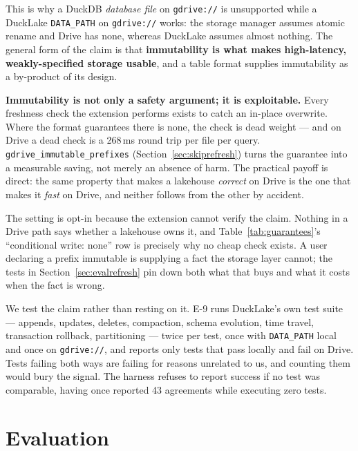 \documentclass[sigconf, nonacm]{acmart}
\newcommand{\expref}[1]{\textsf{E-#1}}
\begin{document}
This is why a DuckDB \emph{database file} on \texttt{gdrive://} is unsupported
while a DuckLake \texttt{DATA\_PATH} on \texttt{gdrive://} works: the storage
manager assumes atomic rename and Drive has none, whereas DuckLake assumes
almost nothing. The general form of the claim is that \textbf{immutability is
what makes high-latency, weakly-specified storage usable}, and a table format
supplies immutability as a by-product of its design.

\textbf{Immutability is not only a safety argument; it is exploitable.}
Every freshness check the extension performs exists to catch an in-place
overwrite. Where the format guarantees there is none, the check is dead
weight --- and on Drive a dead check is a 268\,ms round trip per file per
query. \texttt{gdrive\_immutable\_prefixes} (Section~\ref{sec:skiprefresh})
turns the guarantee into a measurable saving, not merely an absence of harm.
The practical payoff is direct: the same property that makes a lakehouse
\emph{correct} on Drive is the one that makes it \emph{fast} on Drive, and
neither follows from the other by accident.

The setting is opt-in because the extension cannot verify the claim. Nothing in
a Drive path says whether a lakehouse owns it, and Table~\ref{tab:guarantees}'s
``conditional write: none'' row is precisely why no cheap check exists. A user
declaring a prefix immutable is supplying a fact the storage layer cannot; the
tests in Section~\ref{sec:evalrefresh} pin down both what that buys and what it
costs when the fact is wrong.

We test the claim rather than resting on it. \expref{9} runs DuckLake's own
test suite --- appends, updates, deletes, compaction, schema evolution, time
travel, transaction rollback, partitioning --- twice per test, once with
\texttt{DATA\_PATH} local and once on \texttt{gdrive://}, and reports only
tests that pass locally and fail on Drive. Tests failing both ways are failing
for reasons unrelated to us, and counting them would bury the signal. The
harness refuses to report success if no test was comparable, having once
reported 43 agreements while executing zero tests.

\section{Evaluation}
\label{sec:eval}
\end{document}
